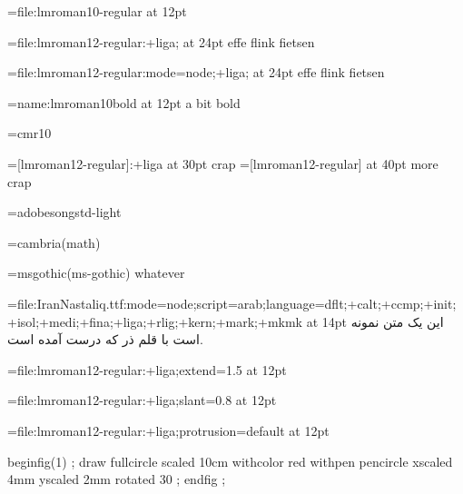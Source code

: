 

%
%


\font\testa=file:lmroman10-regular                  at 12pt \testa  \par
\font\testb=file:lmroman12-regular:+liga;           at 24pt \testb effe flink fietsen \par
\font\testc=file:lmroman12-regular:mode=node;+liga; at 24pt \testc effe flink fietsen \par
\font\testd=name:lmroman10bold                      at 12pt \testd a bit bold \par

\font\oeps=cmr10

\font\oeps=[lmroman12-regular]:+liga at 30pt \oeps crap
\font\oeps=[lmroman12-regular]       at 40pt \oeps more crap

\font\cidtest=adobesongstd-light

\font\mathtest=cambria(math) {}

\font\gothic=msgothic(ms-gothic) {\gothic whatever}

\font\testy=file:IranNastaliq.ttf:mode=node;script=arab;language=dflt;+calt;+ccmp;+init;+isol;+medi;+fina;+liga;+rlig;+kern;+mark;+mkmk at 14pt
\testy این یک متن نمونه است با قلم ذر که درست آمده است.

 

\font\testb=file:lmroman12-regular:+liga;extend=1.5         at 12pt \testb  \par
\font\testb=file:lmroman12-regular:+liga;slant=0.8          at 12pt \testb  \par
\font\testb=file:lmroman12-regular:+liga;protrusion=default at 12pt \testb  \par


\mplibcode
    beginfig(1) ;
        draw fullcircle
            scaled 10cm
            withcolor red
            withpen pencircle xscaled 4mm yscaled 2mm rotated 30 ;
    endfig ;
\endmplibcode


